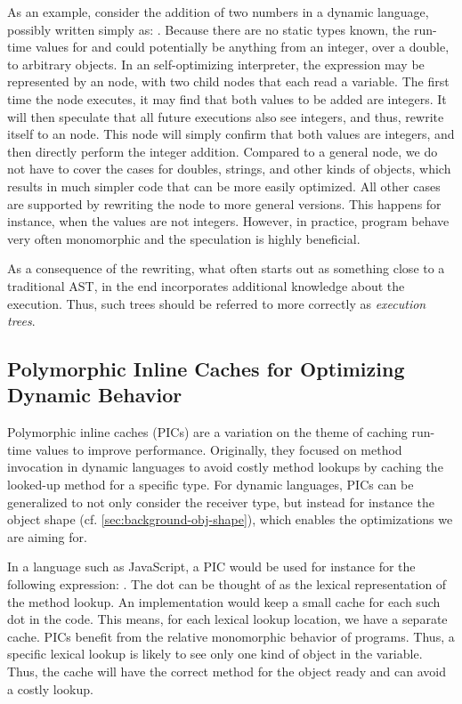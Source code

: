 As an example, consider the addition of two numbers in a dynamic language,
possibly written simply as: .
Because there are no static types known,
the run-time values for  and  could potentially be anything
from an integer, over a double, to arbitrary objects.
In an self-optimizing interpreter, the expression may be represented by
an  node, with two child nodes that each read a variable.
The first time the  node executes,
it may find that both values to be added are integers.
It will then speculate that all future executions
also see integers, and thus, rewrite itself to an  node.
This  node will simply confirm that both values are integers,
and then directly perform the integer addition.
Compared to a general  node,
we do not have to cover the cases for doubles, strings, and other kinds of objects,
which results in much simpler code that can be more easily optimized.
All other cases are supported by rewriting the  node to more general
versions.
This happens for instance, when the values are not integers.
However, in practice, program behave very often monomorphic and
the speculation is highly beneficial.

As a consequence of the rewriting,
what often starts out as something close to a traditional AST,
in the end incorporates additional knowledge about the execution.
Thus, such trees should be referred to more correctly as \emph{execution trees}.


\subsection{Polymorphic Inline Caches for Optimizing Dynamic Behavior}
\label{sec:background-pics}

Polymorphic inline caches (PICs)\citep{Hoelzle:91:PIC}
are a variation on the theme of caching run-time values to improve performance.
Originally, they focused on method invocation in dynamic languages
to avoid costly method lookups by
caching the looked-up method for a specific type.
%
For dynamic languages,
PICs can be generalized to not only consider the receiver type,
but instead for instance the object shape (cf. \cref{sec:background-obj-shape}),
which enables the optimizations we are aiming for.

In a language such as JavaScript,
a PIC would be used for instance for the following expression:
.
The dot can be thought of as the lexical representation of the method lookup.
An implementation would keep a small cache for each such dot in the code.
This means, for each lexical lookup location, we have a separate cache.
PICs benefit from the relative monomorphic behavior of programs.
Thus, a specific lexical lookup is likely to see only one kind of
object in the  variable.
Thus, the cache will have the correct method for the object ready
and can avoid a costly lookup.


